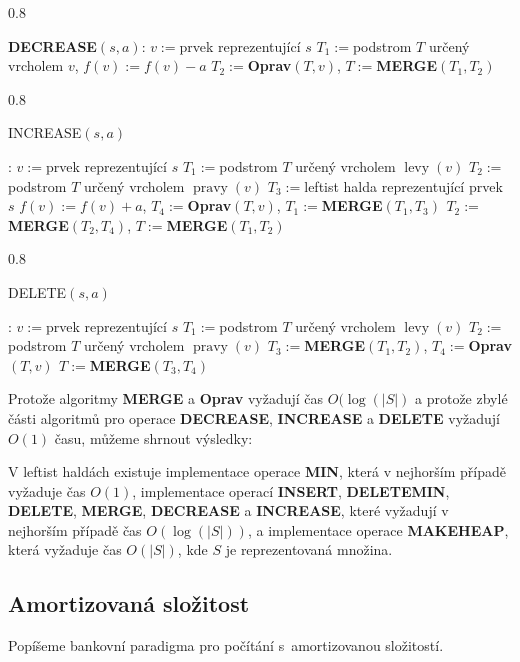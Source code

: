 \documentclass[a4paper,12pt]{article}
\DeclareMathOperator*{\levy}{levy}
\DeclareMathOperator*{\pravy}{pravy}
\newcommand{\algoritmus}[1]{
  {
  \setlength\fboxrule{0.5pt}

  \begin{boxedminipage}{0.8\textwidth}

 #1
  \end{boxedminipage}

  }
  }
\begin{document}
\algoritmus{
{\bf DECREASE$(s,a)$}:\newline 
$v:=$prvek reprezentující $s$\newline 
$T_1$$:=$podstrom $T$ určený vrcholem $v$, $f(v):=f(v)-a$\newline 
$T_2:=${\bf Oprav$(T,v)$}, $T:=${\bf MERGE$(T_1,T_2)$
}}\algoritmus{{\bf

INCREASE$(s,a)$}:\newline 
$v:=$prvek reprezentující $s$\newline 
$T_1:=$podstrom $T$ určený vrcholem $\levy(v)$\newline 
$T_2:=$podstrom $T$ určený  vrcholem $\pravy(v)$\newline 
$T_3:=$leftist halda reprezentující prvek $s$\newline 
$f(v):=f(v)+a$, $T_4:=${\bf Oprav$(T,v)$}, $T_1:=${\bf MERGE$(T_1
,T_3)$\newline 
$T_2:=$MERGE$(T_2,T_4)$}, $T:=${\bf MERGE$(T_1,T_2)$
}}\algoritmus{{\bf

DELETE$(s,a)$}:\newline 
$v:=$prvek reprezentující $s$\newline 
$T_1:=$podstrom $T$ určený vrcholem $\levy(v)$\newline 
$T_2:=$podstrom $T$ určený  vrcholem $\pravy(v)$\newline 
$T_3:=${\bf MERGE$(T_1,T_2)$}, $T_4:=${\bf Oprav$(T,v)$\newline 
$T:=$MERGE$(T_3,T_4)$
}}

Protože algoritmy {\bf MERGE} a {\bf Oprav} vyžadují čas 
$O(\log(|S|)$ a protože zbylé části algoritmů pro operace 
{\bf DECREASE}, {\bf INCREASE} a {\bf DELETE} vyžadují $O(
1)$ času, 
můžeme shrnout výsledky:  

\begin{veta}V leftist haldách existuje implementace operace 
{\bf MIN}, která v nejhorším případě vyžaduje čas $
O(1)$, 
implementace ope\-rací {\bf INSERT}, {\bf DELETEMIN}, {\bf DELETE}, 
{\bf MER\-GE}, {\bf DECREA\-SE} a {\bf INCREA\-SE}, které vyžadují v nejhorším 
pří\-pa\-dě čas $O(\log(|S|))$, a implementace operace {\bf MAKE\-HEAP},
která vyžaduje čas $O(|S|)$, kde $S$ je reprezentovaná množina.
\end{veta}

\subsection{Amortizovaná složitost}

Popíšeme bankovní paradigma pro počítání s~amortizovanou složitostí. 
\end{document}
